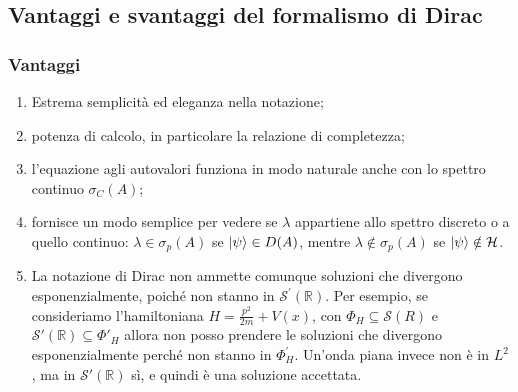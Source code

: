 \documentclass[../../FisicaTeorica.tex]{subfiles}
\begin{document}
\subsection{Vantaggi e svantaggi del formalismo di Dirac}
\subsubsection{Vantaggi}
\begin{enumerate}
\item Estrema semplicità ed eleganza nella notazione;
\item potenza di calcolo, in particolare la relazione di completezza;
\item l'equazione agli autovalori funziona in modo naturale anche con lo spettro continuo $\sigma_C(A)$;
\item fornisce un modo semplice per vedere se $\lambda$ appartiene allo spettro discreto o a quello continuo: $\lambda \in \sigma_p(A)$ se $\Ket\psi \in D(A)$, mentre $\lambda \notin \sigma_p(A)$ se $\Ket\psi \notin \mathcal{H}$.
\item La notazione di Dirac non ammette comunque soluzioni che divergono esponenzialmente, poiché non stanno in $\mathcal{S}^\prime\left(\mathbb{R}\right)$. Per esempio, se consideriamo l'hamiltoniana $H=\frac{p^2}{2m}+V(x)$, con $\Phi_H\subseteq \mathcal S(R)$ e $\mathcal S'\left(\mathbb{R}\right) \subseteq \Phi'_H$
allora non posso prendere le soluzioni che divergono esponenzialmente perché non stanno in $\Phi_H^\prime$. Un'onda piana invece non è in $L^2$, ma in $\mathcal S'\left(\mathbb{R}\right)$ sì, e quindi è una soluzione accettata.
\end{enumerate}
\end{document}
